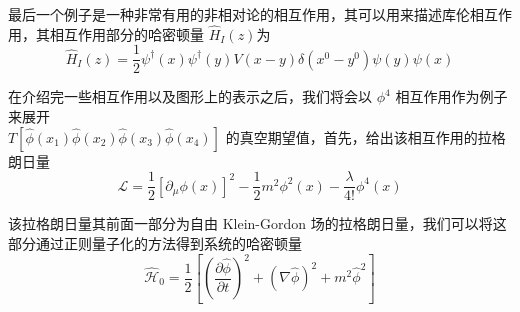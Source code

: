 \begin{table}[hbpt]
    \begin{minipage}{0.5\textwidth}
        \centering
    \end{minipage}
    \hfill
    \begin{minipage}{0.5\textwidth}
        最后一个例子是一种非常有用的非相对论的相互作用，其可以用来描述库伦相互作用，其相互作用部分的哈密顿量 $\hat{H}_I(z)$为
        \begin{equation*}
            \hat{H}_I(z) = \frac{1}{2}\psi^\dagger(x)\psi^\dagger(y)V(x - y)\delta(x^0 - y^0)\psi(y)\psi(x)
        \end{equation*}
    \end{minipage}
\end{table}

在介绍完一些相互作用以及图形上的表示之后，我们将会以 $\phi^4$ 相互作用作为例子来展开 \\
$T[\hat{\phi}(x_1)\hat{\phi}(x_2)\hat{\phi}(x_3)\hat{\phi}(x_4)]$ 的真空期望值，首先，给出该相互作用的拉格朗日量
\begin{equation}
    \mathcal{L} = \frac{1}{2}\left[\partial_\mu \phi(x)\right]^2 - \frac{1}{2}m^2\phi^2(x) - \frac{\lambda}{4!}\phi^4(x)
\end{equation}

该拉格朗日量其前面一部分为自由 Klein-Gordon 场的拉格朗日量，我们可以将这部分通过正则量子化的方法得到系统的哈密顿量
\begin{equation}
    \hat{\mathcal{H}}_0 = \frac{1}{2}\left[\left(\frac{\partial \hat{\phi}}{\partial t}\right)^2 + \left(\nabla\hat{\phi}\right)^2 + m^2\hat{\phi}^2\right] 
\end{equation}

